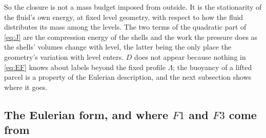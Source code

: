 \documentclass[11pt]{article}
\theoremstyle{definition}
\theoremstyle{remark}
\begin{document}
So the closure is not a mass budget imposed from outside. It is the
stationarity of the fluid's own energy, at fixed level geometry, with
respect to how the fluid distributes its mass among the levels. The two
terms of the quadratic part of \eqref{eq:J} are the compression energy
of the shells and the work the pressure does as the shells' volumes
change with level, the latter being the only place the geometry's
variation with level enters. $D$ does not appear because nothing in
\eqref{eq:EF} knows about labels beyond the fixed profile $\Lambda$; the
buoyancy of a lifted parcel is a property of the Eulerian description,
and the next subsection shows where it goes.

\subsection{The Eulerian form, and where \texorpdfstring{$F1$ and $F3$}{F1 and F3} come from}
\label{sec:eulerianform}
\label{sec:NL-second}
\end{document}
